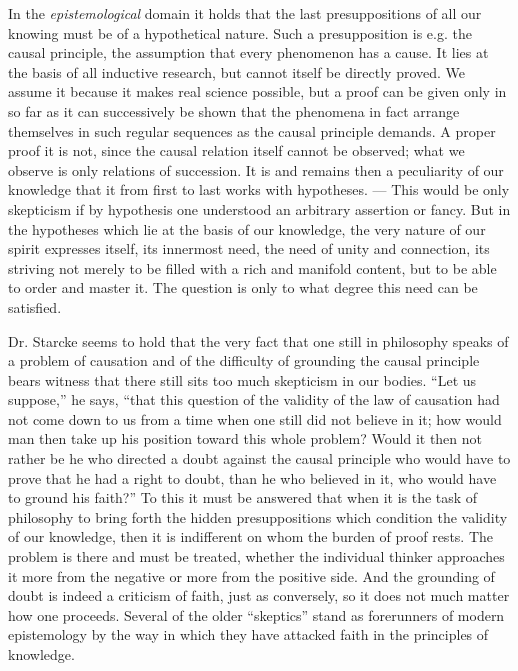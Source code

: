 \documentclass[12pt,a4paper,openany]{book}
\newcommand{\opage}[1]{\marginnote{\footnotesize\textit{[#1]}}}
\begin{document}
In the \emph{epistemological} domain it holds that the
last presuppositions of all our knowing must be of
a hypothetical nature. Such a presupposition is e.g.
the causal principle, the assumption that every phenomenon has a
cause. It lies at the basis of all inductive research, but
cannot itself be directly proved. We assume it because it makes
real science possible, but a proof can be given only in so
far as it can successively be shown that the phenomena
in fact arrange themselves in such regular sequences as
the causal principle demands. A proper proof it is not,
since the causal relation itself cannot be observed; what we
observe is only relations of succession. It is and remains then a
peculiarity of our knowledge that it from first to
last works with hypotheses. --- This would be only
skepticism if by hypothesis one understood an arbitrary
assertion or fancy. But in the hypotheses which lie
\opage{29}at the basis of our knowledge, the very nature of our spirit expresses itself,
its innermost need, the need of unity and
connection, its striving not merely to be filled with a rich and
manifold content, but to be able to order and master it.
The question is only to what degree this need can be
satisfied.

Dr. Starcke seems to hold that the very fact that one still
in philosophy speaks of a problem of causation and of
the difficulty of grounding the causal principle bears witness that there
still sits too much skepticism in our bodies. ``Let us
suppose,'' he says, ``that this question of the validity of the law of causation
had not come down to us from a time when one still
did not believe in it; how would man then take up
his position toward this whole problem? Would it then not rather
be he who directed a doubt against the causal principle who
would have to prove that he had a right to doubt, than he who believed
in it, who would have to ground his faith?'' To this it must be answered
that when it is the task of philosophy to bring forth the hidden
presuppositions which condition the validity of our knowledge, then
it is indifferent on whom the burden of proof rests. The problem
is there and must be treated, whether the individual thinker
approaches it more from the negative or more from the
positive side. And the grounding of doubt is indeed a criticism
of faith, just as conversely, so it does not much matter
how one proceeds. Several of the older ``skeptics''
stand as forerunners of modern epistemology by
the way in which they have attacked faith in the
principles of knowledge.
\end{document}
